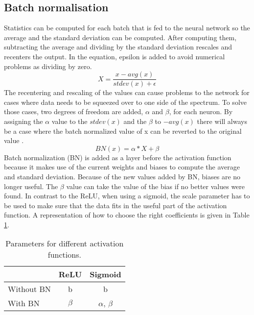 \subsection{Batch normalisation}
Statistics can be computed for each batch that is fed to the neural network so the average and the standard deviation can be computed. After computing them, subtracting the average and dividing by the standard deviation rescales and recenters the output. 
In the equation, epsilon is added to avoid numerical problems as dividing by zero.
\begin{equation}
    X= \dfrac{x - avg(x)}{stdev(x) + \epsilon} 
\end{equation}
The recentering and rescaling of the values can cause problems to
the network for cases where data needs to be squeezed over 
to one side of the spectrum.
To solve those cases, two degrees of freedom are added, 
$\alpha$ and $\beta$, for each neuron. 
By assigning the $\alpha$ value to the $stdev(x)$ and the
$\beta$ to $-avg(x)$ there will always be a case where the batch
normalized value of x can be reverted to the original value \cite{MonDieu}.
\begin{equation}
    BN(x) = \alpha * X + \beta
\end{equation}
Batch normalization (BN) is added as a layer before the activation function
because it makes use of the current weights and biases to
compute the average and standard deviation. Because of the new values added by BN,
biases are no longer useful.
The $\beta$ value can take the value of the bias if no better
values were found.
In contrast to the ReLU, when using a sigmoid,
the scale parameter has to be used to make sure that
the data fits in the useful part of the activation function.
A representation of how to choose the right coefficients is
given in Table \ref{tab:Parameters}.
\begin{table}[htbp]
\centering
    \caption{Parameters for different activation functions.}
    \begin{tabular}{l c c}
    \toprule
          & ReLU & Sigmoid \\\midrule
        Without BN &b & b  \\
        With BN & $\beta$ & $\alpha$, $\beta$  \\
    \bottomrule
    \end{tabular}
\label{tab:Parameters}
\end{table}

